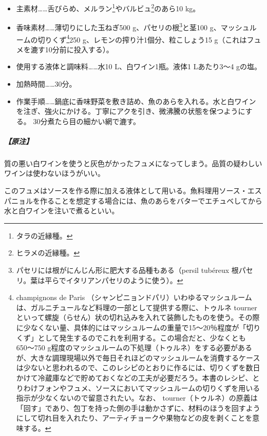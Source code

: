 \begin{recette}
\begin{itemize}
\item
  主素材\ldots{}\ldots{}舌びらめ、メルラン\footnote{タラの近縁種。}やバルビュ\footnote{ヒラメの近縁種。}のあら10
  kg。
\item
  香味素材\ldots{}\ldots{}薄切りにした玉ねぎ500 g、パセリの根\footnote{パセリには根がにんじん形に肥大する品種もある（persil
    tubéreux 根パセリ。葉は平らでイタリアンパセリのように使う）。}と茎100
  g、マッシュルームの切りくず\footnote{champignons de Paris
    （シャンピニョンドパリ）いわゆるマッシュルームは、ガルニチュールなど料理の一部として提供する際に、トゥルネ
    tourner
    といって螺旋（らせん）状の切れ込みを入れて装飾したものを使う。その際に少なくない量、具体的にはマッシュルームの重量で15〜20％程度が「切りくず」として発生するのでこれを利用する。この場合だと、少なくとも650〜750
    g程度のマッシュルームの下処理（トゥルネ）をする必要があるが、大きな調理現場以外で毎日それほどのマッシュルームを消費するケースは少ないと思われるので、このレシピのとおりに作るには、切りくずを数日かけて冷蔵庫などで貯めておくなどの工夫が必要だろう。本書のレシピ、とりわけフォンやフュメ、ソースにおいてマッシュルームの切りくずを用いる指示が少なくないので留意されたい。なお、
    tourner（トゥルネ）の原義は「回す」であり、包丁を持った側の手は動かさずに、材料のほうを回すようにして切れ目を入れたり、アーティチョークや果物などの皮を剥くことを意味する。}250
  g、レモンの搾り汁1個分、粒こしょう15
  g（これはフュメを漉す10分前に投入する）。
\item
  使用する液体と調味料\ldots{}\ldots{}水10 L、白ワイン1瓶。液体1
  Lあたり3〜4 gの塩。
\item
  加熱時間\ldots{}\ldots{}30分。
\item
  作業手順\ldots{}\ldots{}鍋底に香味野菜を敷き詰め、魚のあらを入れる。水と白ワインを注ぎ、強火にかける。丁寧にアクを引き、微沸騰の状態を保つようにする。
  30分煮たら目の細かい網で漉す。
\end{itemize}

\hypertarget{nota-fumet-de-poisson}{%
\subparagraph{【原注】}\label{nota-fumet-de-poisson}}

質の悪い白ワインを使うと灰色がかったフュメになってしまう。品質の疑わしいワインは使わないほうがいい。

このフュメはソースを作る際に加える液体として用いる。魚料理用ソース・エスパニョルを作ることを想定する場合には、魚のあらをバターでエチュベしてから水と白ワインを注いで煮るといい。

\atoaki{}

\hypertarget{fonds-de-poisson-au-vin-rouge}{%
}
\end{recette}

